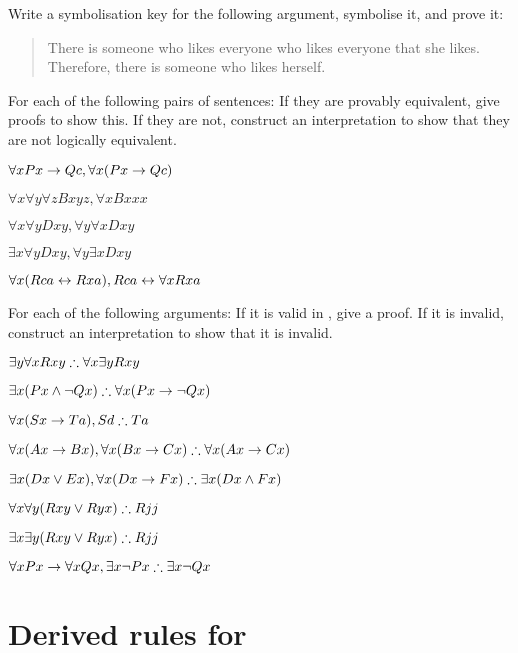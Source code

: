 \solutions
\problempart
\label{pr.likes}
Write a symbolisation key for the following argument, symbolise it, and prove it:
\begin{quote}
There is someone who likes everyone who likes everyone that she likes. Therefore, there is someone who likes herself.
\end{quote}

\solutions
\problempart
\label{pr.FOLequivornot}
For each of the following pairs of sentences: If they are provably equivalent, give proofs to show this. If they are not, construct an interpretation to show that they are not logically equivalent.
\begin{earg}
\item $\forall x Px \rightarrow Qc, \forall x (Px \rightarrow Qc)$
\item $\forall x\forall y \forall z Bxyz, \forall x Bxxx$
\item $\forall x\forall y Dxy, \forall y\forall x Dxy$
\item $\exists x\forall y Dxy, \forall y\exists x Dxy$
\item $\forall x (Rca \leftrightarrow Rxa), Rca \leftrightarrow \forall x Rxa$
\end{earg}

\solutions
\problempart
\label{pr.FOLvalidornot}
For each of the following arguments: If it is valid in \FOL, give a proof. If it is invalid, construct an interpretation to show that it is invalid.
\begin{earg}
\item $\exists y\forall x Rxy \mathrel{\therefore} \forall x\exists y Rxy$
\item $\exists x(Px \wedge \neg Qx) \mathrel{\therefore} \forall x(Px \rightarrow \neg Qx)$
\item $\forall x(Sx \rightarrow Ta), Sd \mathrel{\therefore} Ta$
\item $\forall x(Ax\rightarrow Bx), \forall x(Bx \rightarrow Cx) \mathrel{\therefore} \forall x(Ax \rightarrow Cx)$
\item $\exists x(Dx \vee Ex), \forall x(Dx \rightarrow Fx) \mathrel{\therefore} \exists x(Dx \wedge Fx)$
\item $\forall x\forall y(Rxy \vee Ryx) \mathrel{\therefore} Rjj$
\item $\exists x\exists y(Rxy \vee Ryx) \mathrel{\therefore} Rjj$
\item $\forall x Px \rightarrow \forall x Qx, \exists x \neg Px \mathrel{\therefore} \exists x \neg Qx$
\end{earg}


\chapter{Derived rules for \textnormal{\FOL}}\label{s:CQ}


